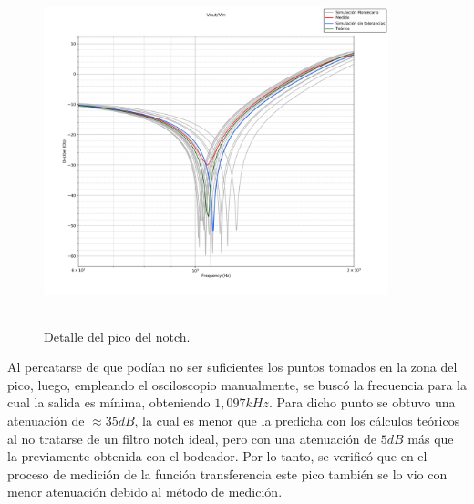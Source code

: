 \begin{figure}[H] %
	\centering
	\includegraphics[width=10cm,height=10cm,keepaspectratio]{../EJ1/00GRAFICOS/pico.png}
	\caption{Detalle del pico del notch.}
	\label{pico}
\end{figure}

Al percatarse de que pod\'ian no ser suficientes los puntos tomados en la zona del pico, luego, empleando el osciloscopio manualmente, se busc\'o la frecuencia para la cual la salida es m\'inima, obteniendo $1,097kHz$. Para dicho punto se obtuvo una atenuaci\'on de $\approx35dB$, la cual es menor que la predicha con los c\'alculos te\'oricos al no tratarse de un filtro notch ideal, pero con una atenuaci\'on de $5dB$ m\'as que la previamente obtenida con el bodeador. Por lo tanto, se verific\'o que en el proceso de medici\'on de la funci\'on transferencia este pico tambi\'en se lo vio con menor atenuaci\'on debido al m\'etodo de medici\'on.


